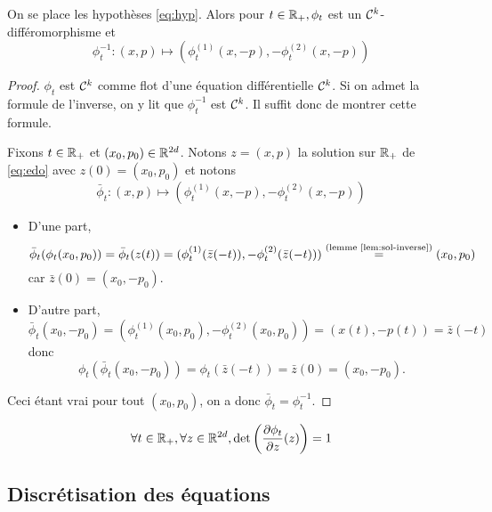 \documentclass[10pt,a4paper]{article}
\begin{document}
\begin{Prop}[réversibilité]\label{prop:rev}
	On se place les hypothèses \eqref{eq:hyp}. Alors pour $t \in \mathbb{R}_+, \phi_t$ est un $\mathcal{C}^k$-différomorphisme et
	$$
	\phi_t^{-1} : (x,p) \mapsto (\phi_t^{(1)}(x, -p), - \phi_t^{(2)}(x, -p))
	$$
\end{Prop}
\begin{proof}
	$\phi_t$ est $\mathcal{C}^k$ comme flot d'une équation différentielle $\mathcal{C}^k$. Si on admet la formule de l'inverse, on y lit que $\phi_t^{-1}$ est $\mathcal{C}^k$. Il suffit donc de montrer cette formule.

	Fixons $t \in \mathbb{R}_+$ et $(x_0,p_0) \in \mathbb{R}^{2d}$. Notons $z=(x,p)$ la solution sur $\mathbb{R}_+$ de \eqref{eq:edo} avec $z(0) = (x_0,p_0)$ et notons
	$$
	\bar \phi_t : (x,p) \mapsto (\phi_t^{(1)}(x, -p), - \phi_t^{(2)}(x, -p))
	$$
        \begin{itemize}
		\item D'une part,
		$$
		\bar \phi_t(\phi_t(x_0,p_0)) = \bar \phi_t(z(t)) = (\phi_t^{(1)}(\bar z(-t)), - \phi_t^{(2)}(\bar z(-t))) \overset{\text{(lemme \ref{lem:sol-inverse})}}{=} (x_0, p_0)
		$$
		car $\bar z(0) = (x_0,-p_0)$.

		\item D'autre part,
		$$
		\bar \phi_t(x_0,-p_0) = (\phi_t^{(1)}(x_0, p_0), - \phi_t^{(2)}(x_0, p_0)) = (x(t),-p(t)) = \bar z(-t)
		$$
		donc
		$$
		\phi_t (\bar \phi_t(x_0,-p_0)) = \phi_t(\bar z(-t)) = \bar{z}(0) = (x_0,-p_0).
		$$
	\end{itemize}
	Ceci étant vrai pour tout $(x_0,p_0)$, on a donc $\bar \phi_t = \phi_t^{-1}$.
\end{proof}


\begin{Prop}\label{prop:vol}
	$$
	\forall t \in \mathbb{R}_+, \forall z \in \mathbb{R}^{2d}, \det \left( \frac{\partial \phi_t}{\partial z}(z) \right) = 1
	$$
\end{Prop}

\subsection{Discrétisation des équations}

\end{document}

